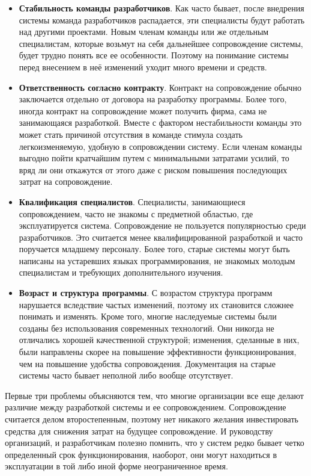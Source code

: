 \documentclass{../../text-style}
\begin{document}
\begin{itemize}
    \item \textbf{Стабильность команды разработчиков}. Как часто бывает, после внедрения системы команда разработчиков распадается, эти специалисты будут работать над другими проектами. Новым членам команды или же отдельным специалистам, которые возьмут на себя дальнейшее сопровождение системы, будет трудно понять все ее особенности. Поэтому на понимание системы перед внесением в неё изменений уходит много времени и средств.
    \item \textbf{Ответственность согласно контракту}. Контракт на сопровождение обычно заключается отдельно от договора на разработку программы. Более того, иногда контракт на сопровождение может получить фирма, сама не занимающаяся разработкой. Вместе с фактором нестабильности команды это может стать причиной отсутствия в команде стимула создать легкоизменяемую, удобную в сопровождении систему. Если членам команды выгодно пойти кратчайшим путем с минимальными затратами усилий, то вряд ли они откажутся от этого даже с риском повышения последующих затрат на сопровождение.
    \item \textbf{Квалификация специалистов}. Специалисты, занимающиеся сопровождением, часто не знакомы с предметной областью, где эксплуатируется система. Сопровождение не пользуется популярностью среди разработчиков. Это считается менее квалифицированной разработкой и часто поручается младшему персоналу. Более того, старые системы могут быть написаны на устаревших языках программирования, не знакомых молодым специалистам и требующих дополнительного изучения.
    \item \textbf{Возраст и структура программы}. С возрастом структура программ нарушается вследствие частых изменений, поэтому их становится сложнее понимать и изменять. Кроме того, многие наследуемые системы были созданы без использования современных технологий. Они никогда не отличались хорошей качественной структурой; изменения, сделанные в них, были направлены скорее на повышение эффективности функционирования, чем на повышение удобства сопровождения. Документация на старые системы часто бывает неполной либо вообще отсутствует.
\end{itemize}

Первые три проблемы объясняются тем, что многие организации все еще делают различие между разработкой системы и ее сопровождением. Сопровождение считается делом второстепенным, поэтому нет никакого желания инвестировать средства для снижения затрат на будущее сопровождение. И руководству организаций, и разработчикам полезно помнить, что у систем редко бывает четко определенный срок функционирования, наоборот, они могут находиться в эксплуатации в той либо иной форме неограниченное время.
\end{document}
